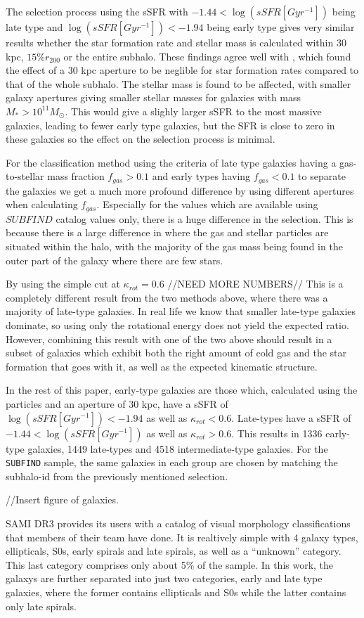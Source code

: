 The selection process using the sSFR with $ -1.44 < \log (sSFR[Gyr^{-1}]) $ being late type and $\log (sSFR[Gyr^{-1}]) < -1.94$ being early type gives very similar results whether the star formation rate and stellar mass is calculated within 30 kpc, $15\% r_{200}$ or the entire subhalo. These findings agree well with \textcite{Schaye2015}, which found the effect of a 30 kpc aperture to be neglible for star formation rates compared to that of the whole subhalo. The stellar mass is found to be affected, with smaller galaxy apertures giving smaller stellar masses for galaxies with mass $M_* > 10^{11}M_{\odot}$. This would give a slighly larger sSFR to the most massive galaxies, leading to fewer early type galaxies, but the SFR is close to zero in these galaxies so the effect on the selection process is minimal.

For the classification method using the criteria of late type galaxies having a gas-to-stellar mass fraction $f_{gas} > 0.1$ and early types having $f_{gas} < 0.1$ to separate the galaxies we get a much more profound difference by using different apertures when calculating $f_{gas}$. Especially for the values which are available using $SUBFIND$ catalog values only, there is a huge difference in the selection. This is because there is a large difference in where the gas and stellar particles are situated within the halo, with the majority of the gas mass being found in the outer part of the galaxy where there are few stars.

By using the simple cut at $\kappa_{rot} = 0.6$ //NEED MORE NUMBERS// This is a completely different result from the two methods above, where there was a majority of late-type galaxies. In real life we know that smaller late-type galaxies dominate, so using only the rotational energy does not yield the expected ratio. However, combining this result with one of the two above should result in a subset of galaxies which exhibit both the right amount of cold gas and the star formation that goes with it, as well as the expected kinematic structure.

In the rest of this paper, early-type galaxies are those which, calculated using the particles and an aperture of 30 kpc, have a sSFR of $\log (sSFR[Gyr^{-1}]) < -1.94$ as well as $\kappa_{rot} < 0.6$. Late-types have a sSFR of $ -1.44 < \log (sSFR[Gyr^{-1}]) $ as well as $\kappa_{rot} > 0.6$. This results in 1336 early-type galaxies, 1449 late-types and 4518 intermediate-type galaxies. For the \texttt{SUBFIND} sample, the same galaxies in each group are chosen by matching the subhalo-id from the previously mentioned selection. 

//Insert figure of galaxies.


SAMI DR3 provides its users with a catalog of visual morphology classifications that members of their team have done. It is realtively simple with 4 galaxy types, ellipticals, S0s, early spirals and late spirals, as well as a ``unknown'' category. This last category comprises only about 5\% of the sample. In this work, the galaxys are further separated into just two categories, early and late type galaxies, where the former contains ellipticals and S0s while the latter contains only late spirals.
